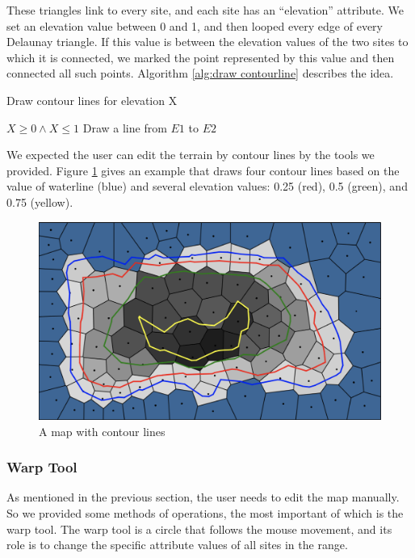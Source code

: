 These triangles link to every site, and each site has an ``elevation'' attribute. We set an elevation value between 0 and 1, and then looped every edge of every Delaunay triangle. If this value is between the elevation values of the two sites to which it is connected, we marked the point represented by this value and then connected all such points. Algorithm \ref{alg:draw contourline} describes the idea.

\begin{algorithm}
\caption{Draw contour lines for elevation X}
\label{alg:draw contourline}
\begin{algorithmic}
\REQUIRE $X \geq 0 \wedge X \leq 1$
\STATE Draw a line from $E1$ to $E2$
\ENDIF
\ENDFOR
\ENDFOR
\end{algorithmic}
\end{algorithm}

We expected the user can edit the terrain by contour lines by the tools we provided. Figure \ref{fig:contour line} gives an example that draws four contour lines based on the value of waterline (blue) and several elevation values: 0.25 (red), 0.5 (green), and 0.75 (yellow).

\begin{figure}[htbp]
  \includegraphics[width=\textwidth]{section04/assets/Map-contourline.png}
  \caption{A map with contour lines}
  \label{fig:contour line}
\end{figure}

\subsubsection{Warp Tool}
As mentioned in the previous section, the user needs to edit the map manually. So we provided some methods of operations, the most important of which is the warp tool. The warp tool is a circle that follows the mouse movement, and its role is to change the specific attribute values of all sites in the range.

